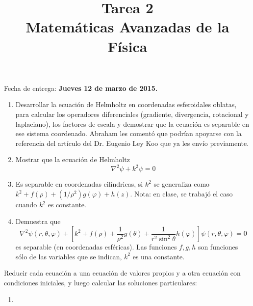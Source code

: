
\usepackage{enumerate}
\title{{Tarea 2} \\ {\large Matemáticas Avanzadas de la Física}}
\date{ }

\renewcommand\labelenumii{\theenumi.{\arabic{enumii}}}
\maketitle
\fontsize{14}{14}\selectfont
Fecha de entrega: \textbf{Jueves 12 de marzo de 2015.}
\begin{enumerate}
\item Desarrollar la ecuación de Helmholtz en coordenadas esferoidales oblatas, para calcular los operadores diferenciales (gradiente, divergencia, rotacional y laplaciano), los factores de escala y demostrar que la ecuación es separable en ese sistema coordenado. Abraham les comentó que podrían apoyarse con la referencia del artículo del Dr. Eugenio Ley Koo que ya les envío previamente.
\item Mostrar que la ecuación de Helmholtz
\[ \nabla^{2} \psi + k^{2} \psi = 0 \]
\item Es separable en coordenadas cilíndricas, si $k^{2}$ se generaliza como $k^{2} + f(\rho) + (1/\rho^{2}) g(\varphi) +  h(z)$. Nota: en clase, se trabajó el caso cuando $k^{2}$ es constante.
\item Demuestra que
\[ \nabla^{2} \psi(r,\theta,\varphi) + \left[ k^{2} + f(\rho) + \dfrac{1}{\rho^{2}} g(\theta) + \dfrac{1}{r^{2}\sin^{2} \theta} h(\varphi) \right] \psi (r,\theta,\varphi) = 0 \]
es separable (en coordenadas esféricas). Las funciones $f,g,h$ son funciones sólo de las variables que se indican, $k^{2}$ es una constante.
\end{enumerate}
\item Reducir cada ecuación a una ecuación de valores propios y a otra ecuación con condiciones iniciales, y luego calcular las soluciones particulares:
\begin{enumerate}[label=(\alph*)]
\item \begin{fleqn}
\[ \dfrac{\partial^{2} u}{\partial t^{2}} - \dfrac{\partial^{2} u}{\partial x^{2}} - u = 0 \hspace{1cm} \text{para } 0 < x < 1, t>0 \]
\[ \dfrac{\partial^{2} u}{\partial t} (x,0) = 0\]
\[ u(0,t) = u(1,t) = 0\]

\item \[ \dfrac{\partial^{2} u}{\partial t^{2}} + 2 \dfrac{\partial u}{\partial t} - 4 \dfrac{\partial^{2} u}{\partial x^{2}} +  u = 0 \hspace{1cm} \text{para } 0 < x < 1, t>0 \]
\[ u(x,0) = 0\]
\[ \dfrac{\partial u}{\partial x} (0,t) = u(1,t) = 0\] 
\end{fleqn}
\end{enumerate}

